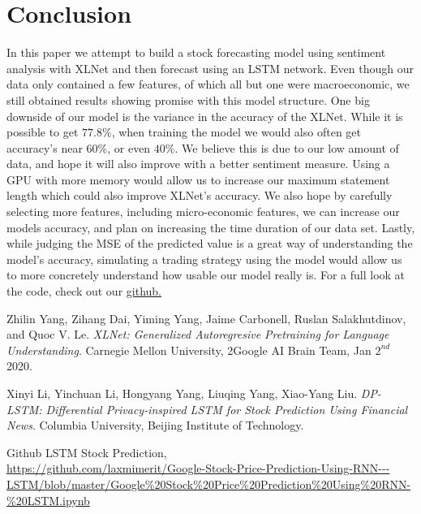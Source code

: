 \documentclass{article}
\begin{document}
\section{Conclusion}
In this paper we attempt to build a stock forecasting model using sentiment analysis with XLNet and then forecast using an LSTM network. Even though our data only contained a few features, of which all but one were macroeconomic, we still obtained results showing promise with this model structure. One big downside of our model is the variance in the accuracy of the XLNet. While it is possible to get $77.8\%$, when training the model we would also often get accuracy's near $60\%$, or even $40\%$. We believe this is due to our low amount of data, and hope it will also improve with a better sentiment measure. Using a GPU with more memory would allow us to increase our maximum statement length which could also improve XLNet's accuracy. We also hope by carefully selecting more features, including micro-economic features, we can increase our models accuracy, and plan on increasing the time duration of our data set. Lastly, while judging the MSE of the predicted value is a great way of understanding the model's accuracy, simulating a trading strategy using the model would allow us to more concretely understand how usable our model really is. For a full look at the code, check out our \href{https://github.com/BHill96/AdvancedBigDataAnalytics}{github.}

\begin{thebibliography}{9}
Zhilin Yang, Zihang Dai, Yiming Yang, Jaime Carbonell, Ruslan Salakhutdinov, and Quoc V. Le. 
\textit{XLNet: Generalized Autoregresive Pretraining for Language Understanding}. 
Carnegie Mellon University, 2Google AI Brain Team, Jan $2^{nd}$ 2020.

Xinyi Li, Yinchuan Li, Hongyang Yang, Liuqing Yang, Xiao-Yang Liu.
\textit{DP-LSTM: Differential Privacy-inspired LSTM for Stock Prediction Using Financial News}. Columbia University, Beijing Institute of Technology.

Github LSTM Stock Prediction,
\\\url{https://github.com/laxmimerit/Google-Stock-Price-Prediction-Using-RNN---LSTM/blob/master/Google%20Stock%20Price%20Prediction%20Using%20RNN-%20LSTM.ipynb}
\end{thebibliography}
\end{document}
